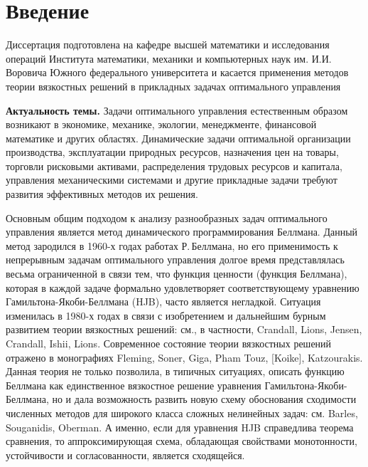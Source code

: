 \chapter*{Введение}							%
Диссертация подготовлена на кафедре высшей математики и исследования операций Института математики, механики и компьютерных наук им. И.И.\,Воровича Южного федерального университета и касается применения методов теории вязкостных решений в прикладных
задачах оптимального управления 

\textbf{Актуальность темы.}
Задачи оптимального управления естественным образом возникают в экономике, механике, экологии, менеджменте, финансовой математике и других областях. Динамические задачи оптимальной организации производства, эксплуатации природных ресурсов, назначения цен на товары, торговли рисковыми активами, распределения трудовых ресурсов и капитала, управления механическими системами и другие прикладные задачи требуют развития эффективных методов их решения. 

Основным общим подходом к анализу разнообразных задач оптимального управления является метод динамического программирования Беллмана. Данный метод зародился в 1960-х годах работах Р.\,Беллмана, но его применимость к непрерывным задачам оптимального управления долгое время представлялась весьма ограниченной в связи тем, что функция ценности (функция Беллмана), которая в каждой задаче формально удовлетворяет соответствующему уравнению Гамильтона-Якоби-Беллмана (HJB), часто является негладкой.
Ситуация изменилась в 1980-х годах в связи с изобретением и дальнейшим бурным развитием теории вязкостных решений: см., в частности, Crandall, Lions\cite{CraLio84}, Jensen\cite{Jen89}, Crandall, Ishii, Lions\cite{CraIshLio92}. Современное состояние теории вязкостных решений отражено в монографиях Fleming, Soner\cite{FleSon06}, Giga\cite{Giga06}, Pham\cite{Pha09} Touz\cite{Tou13}, [Koike], Katzourakis\cite{Katz14}. Данная теория не только позволила, в типичных ситуациях, описать функцию Беллмана как единственное вязкостное решение уравнения Гамильтона-Якоби-Беллмана, но и дала возможность развить новую схему обоснования сходимости численных методов для широкого класса сложных нелинейных задач: см. Barles, Souganidis\cite{BarSou91}, Oberman\cite{Obe06}. А именно, если для уравнения HJB справедлива теорема сравнения, то аппроксимирующая схема, обладающая свойствами монотонности, устойчивости и согласованности, является сходящейся.

